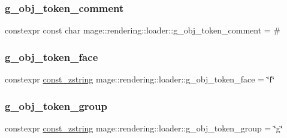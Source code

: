\hypertarget{namespacemage_1_1rendering_1_1loader_a28d2091ac0bc8a30979e417ca93adfb9}{}\label{namespacemage_1_1rendering_1_1loader_a28d2091ac0bc8a30979e417ca93adfb9} 
\subsubsection{\texorpdfstring{g\+\_\+obj\+\_\+token\+\_\+comment}{g\_obj\_token\_comment}}
{\footnotesize\ttfamily constexpr const char mage\+::rendering\+::loader\+::g\+\_\+obj\+\_\+token\+\_\+comment = \textquotesingle{}\#\textquotesingle{}}

\hypertarget{namespacemage_1_1rendering_1_1loader_ac729da300a11d2af468702b4fd8c17a0}{}\label{namespacemage_1_1rendering_1_1loader_ac729da300a11d2af468702b4fd8c17a0} 
\subsubsection{\texorpdfstring{g\+\_\+obj\+\_\+token\+\_\+face}{g\_obj\_token\_face}}
{\footnotesize\ttfamily constexpr \hyperlink{namespacemage_abfd9206dc607ceb5d13ec68bf075a5c0}{const\+\_\+zstring} mage\+::rendering\+::loader\+::g\+\_\+obj\+\_\+token\+\_\+face = \char`\"{}f\char`\"{}}

\hypertarget{namespacemage_1_1rendering_1_1loader_a71c11c96ce588a1bc2dda43c4b0711c1}{}\label{namespacemage_1_1rendering_1_1loader_a71c11c96ce588a1bc2dda43c4b0711c1} 
\subsubsection{\texorpdfstring{g\+\_\+obj\+\_\+token\+\_\+group}{g\_obj\_token\_group}}
{\footnotesize\ttfamily constexpr \hyperlink{namespacemage_abfd9206dc607ceb5d13ec68bf075a5c0}{const\+\_\+zstring} mage\+::rendering\+::loader\+::g\+\_\+obj\+\_\+token\+\_\+group = \char`\"{}g\char`\"{}}

